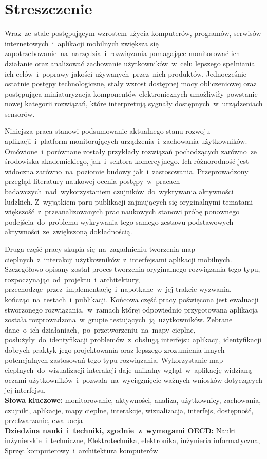 \chapter*{Streszczenie}
Wraz~ze~stale postępującym wzrostem użycia komputerów, programów, serwisów internetowych~i~aplikacji mobilnych zwiększa się zapotrzebowanie~na~narzędzia~i~rozwiązania pomagające monitorować ich działanie oraz analizować zachowanie użytkowników~w~celu lepszego spełniania ich celów~i~poprawy jakości używanych~przez~nich produktów. Jednocześnie ostatnie postępy technologiczne, stały wzrost dostępnej mocy obliczeniowej oraz postępująca miniaturyzacja komponentów elektronicznych umożliwiły powstanie nowej kategorii rozwiązań, które interpretują sygnały dostępnych~w~urządzeniach sensorów. 

Niniejsza praca stanowi podsumowanie aktualnego stanu rozwoju aplikacji~i~platform monitorujących urządzenia~i~zachowania użytkowników. Omówione~i~porównane zostały przykłady rozwiązań pochodzących zarówno~ze środowiska akademickiego, jak~i~sektora komercyjnego. Ich różnorodność jest widoczna zarówno~na~poziomie budowy jak~i~zastosowania. Przeprowadzony przegląd literatury naukowej ocenia postępy~w~pracach badawczych~nad~wykorzystaniem czujników~do~wykrywania aktywności ludzkich. Z~wyjątkiem paru publikacji zajmujących się oryginalnymi tematami większość~z~przeanalizowanych prac naukowych stanowi próbę ponownego podejścia~do~problemu wykrywania tego samego zestawu podstawowych aktywności~ze~zwiększoną dokładnością. 

Druga część pracy skupia się~na~zagadnieniu tworzenia map cieplnych~z~interakcji użytkowników~z~interfejsami aplikacji mobilnych. Szczegółowo opisany został proces tworzenia oryginalnego rozwiązania tego typu, rozpoczynając~od~projektu~i~architektury, przechodząc~przez~implementację~i~napotkane~w~jej trakcie wyzwania, kończąc~na~testach~i~publikacji. Końcowa część pracy poświęcona jest ewaluacji stworzonego rozwiązania,~w~ramach której odpowiednio przygotowana aplikacja została rozprowadzona~w~grupie testujących~ją~użytkowników. Zebrane dane~o~ich działaniach,~po~przetworzeniu~na~mapy cieplne, posłużyły~do~identyfikacji problemów~z~obsługą interfejsu aplikacji, identyfikacji dobrych praktyk jego projektowania oraz lepszego zrozumienia innych potencjalnych zastosowań tego typu rozwiązania. Wykorzystanie map cieplnych~do~wizualizacji interakcji daje unikalny wgląd~w~aplikację widzianą oczami użytkowników~i~pozwala~na~wyciągnięcie ważnych wniosków dotyczących jej interfejsu. \\

\noindent\textbf{Słowa kluczowe:} monitorowanie, aktywności, analiza, użytkownicy, zachowania, czujniki, aplikacje, mapy cieplne, interakcje, wizualizacja, interfejs, dostępność, przetwarzanie, ewaluacja \\

\noindent\textbf{Dziedzina nauki~i~techniki, zgodnie~z~wymogami OECD:} Nauki inżynierskie~i~techniczne, Elektrotechnika, elektronika, inżynieria informatyczna, Sprzęt komputerowy~i~architektura komputerów
